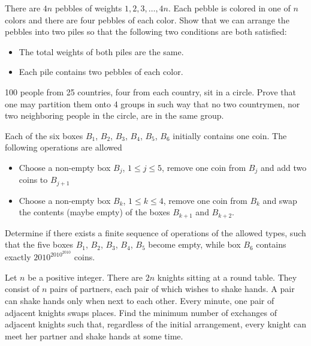 \begin{problem} [IMO 2020]
    There are $4n$ pebbles of weights $1, 2, 3, \dots, 4n.$ Each pebble is colored in one of $n$ colors and there are four pebbles of each color. Show that we can arrange the pebbles into two piles so that the following two conditions are both satisfied:
    \begin{itemize}
        \item The total weights of both piles are the same.
        \item Each pile contains two pebbles of each color.
    \end{itemize}
\end{problem}

\begin{problem} 
    100 people from 25 countries, four from each country, sit in a circle. Prove that one may partition them onto 4 groups in such way that no two countrymen, nor two neighboring people in the circle, are in the same group. 
\end{problem}

\begin{problem} [IMO 2010]
    Each of the six boxes $B_1$, $B_2$, $B_3$, $B_4$, $B_5$, $B_6$ initially contains one coin. The following operations are allowed
    \begin{itemize}
        \item Choose a non-empty box $B_j$, $1\leq j \leq 5$, remove one coin from $B_j$ and add two coins to $B_{j+1}$
        \item Choose a non-empty box $B_k$, $1\leq k \leq 4$, remove one coin from $B_k$ and swap the contents (maybe empty) of the boxes $B_{k+1}$ and $B_{k+2}$.
    \end{itemize}
    Determine if there exists a finite sequence of operations of the allowed types, such that the five boxes $B_1$, $B_2$, $B_3$, $B_4$, $B_5$ become empty, while box $B_6$ contains exactly $2010^{2010^{2010}}$ coins.
\end{problem}

\begin{problem} [ISL 2024 C3]
    Let $n$ be a positive integer. There are $2n$ knights sitting at a round table. They consist of $n$ pairs of partners, each pair of which wishes to shake hands. A pair can shake hands only when next to each other. Every minute, one pair of adjacent knights swaps places. Find the minimum number of exchanges of adjacent knights such that, regardless of the initial arrangement, every knight can meet her partner and shake hands at some time.
\end{problem}


